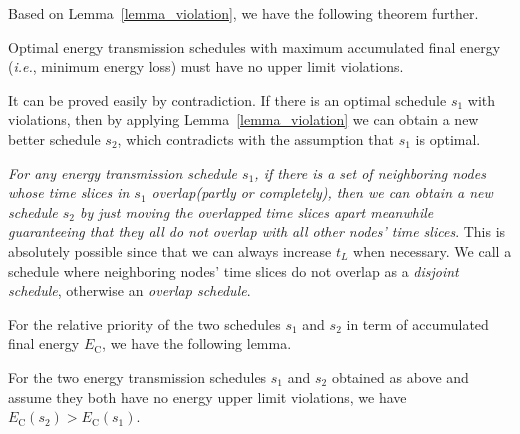 \documentclass[journal,10pt]{IEEEtran}
\begin{document}
Based on Lemma~\ref{lemma_violation}, we have the following theorem further.

\begin{theorem}
\label{theorem_no_violation}
Optimal energy transmission schedules with maximum accumulated final energy (\textit{i.e.}, minimum energy loss) must have no upper limit violations.
\end{theorem}

\begin{IEEEproof}
It can be proved easily by contradiction. If there is an optimal schedule $s_1$ with violations, then by applying Lemma~\ref{lemma_violation} we can obtain a new better schedule $s_2$, which contradicts with the assumption that $s_1$ is optimal.
\end{IEEEproof}


\textit{For any energy transmission schedule $s_1$, if there is a set of neighboring nodes whose time slices in $s_{1}$ overlap(partly or completely), then we can obtain a new schedule $s_{2}$ by just moving the overlapped time slices apart meanwhile guaranteeing that they all do not overlap with all other nodes' time slices}. This is absolutely possible since that we can always increase $t_L$ when necessary. We call a schedule where neighboring nodes' time slices do not overlap as a \textit{disjoint schedule}, otherwise an \textit{overlap schedule}.

For the relative priority of the two schedules $s_1$ and $s_2$ in term of accumulated final energy $E_\text{C}$, we have the following lemma.

\begin{lemma}
\label{lemma_interval_disjoint}
For the two energy transmission schedules $s_1$ and $s_2$ obtained as above and assume they both have no energy upper limit violations, we have $E_\text{C}(s_2){>}E_\text{C}(s_1)$.
\end{lemma}
\end{document}
